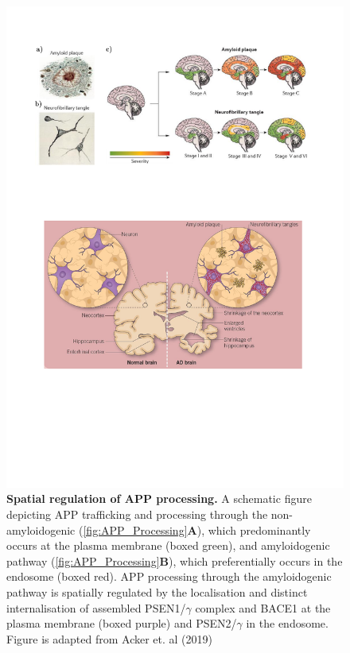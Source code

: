 \begin{figure}[!htp]
	\centering
	\includegraphics[page=6,trim={0 8cm 0cm 0cm},clip, scale = 0.7]{Figures/Introduction_Figures.pdf}
	\captionsetup{width=0.95\textwidth,singlelinecheck=off}
	\caption[Spatial regulation of APP trafficking and processing]%
	{\textbf{Spatial regulation of APP processing.} A schematic figure depicting APP trafficking and processing through the non-amyloidogenic (\cref{fig:APP_Processing}\textbf{A}), which predominantly occurs at the plasma membrane (boxed green), and amyloidogenic pathway (\cref{fig:APP_Processing}\textbf{B}), which preferentially occurs in the endosome (boxed red). APP processing through the amyloidogenic pathway is spatially regulated by the localisation and distinct internalisation of assembled PSEN1/$\gamma$ complex and BACE1 at the plasma membrane (boxed purple) and PSEN2/$\gamma$ in the endosome. Figure is adapted from Acker et. al (2019)\cite{Acker2019}  
	}
	\label{fig:APP_Trafficking}
\end{figure}

